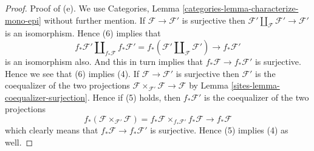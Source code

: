 \begin{proof}
\medskip\noindent
Proof of (e). We use
Categories, Lemma \ref{categories-lemma-characterize-mono-epi}
without further mention.
If $\mathcal{F} \to \mathcal{F}'$ is surjective then
$\mathcal{F}' \amalg_\mathcal{F} \mathcal{F}' \to \mathcal{F}'$
is an isomorphism. Hence (6) implies that
$$
f_*\mathcal{F}' \amalg_{f_*\mathcal{F}} f_*\mathcal{F}' =
f_*(\mathcal{F}' \amalg_\mathcal{F} \mathcal{F}')
\longrightarrow
f_*\mathcal{F}'
$$
is an isomorphism also. And this in turn implies that
$f_*\mathcal{F} \to f_*\mathcal{F}'$ is surjective.
Hence we see that (6) implies (4). If $\mathcal{F} \to \mathcal{F}'$
is surjective then $\mathcal{F}'$ is the coequalizer of the two
projections $\mathcal{F} \times_{\mathcal{F}'} \mathcal{F} \to \mathcal{F}$
by Lemma \ref{sites-lemma-coequalizer-surjection}.
Hence if (5) holds, then $f_*\mathcal{F}'$ is the coequalizer of
the two projections
$$
f_*(\mathcal{F} \times_{\mathcal{F}'} \mathcal{F}) =
f_*\mathcal{F} \times_{f_*\mathcal{F}'} f_*\mathcal{F}
\longrightarrow
f_*\mathcal{F}
$$
which clearly means that $f_*\mathcal{F} \to f_*\mathcal{F}'$ is
surjective. Hence (5) implies (4) as well.


\end{proof}
